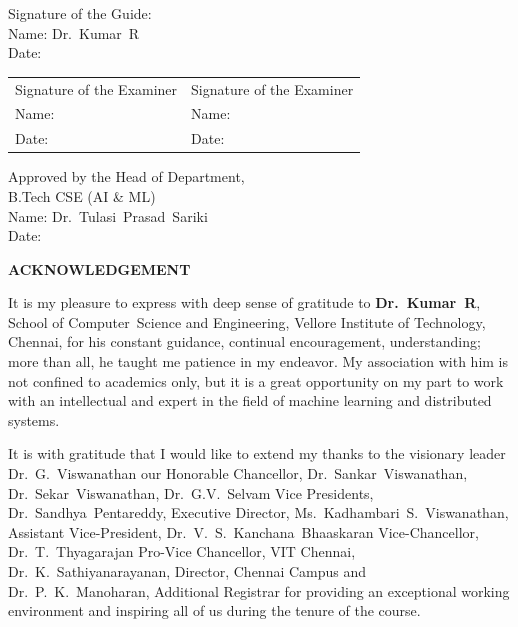 \documentclass[12pt,a4paper]{report}
\begin{document}
\noindent Signature of the Guide:\\
Name: \mbox{Dr.~Kumar~R}\\
Date: 

\vspace{2cm}

\begin{tabular}{p{7cm}p{7cm}}
Signature of the Examiner & Signature of the Examiner \\
Name:  & Name:  \\
Date: & Date: \\
\end{tabular}

\vspace{2cm}

\begin{flushright}
Approved by the Head of Department,\\
B.Tech CSE (AI \& ML)\\[0.3cm]
Name: \mbox{Dr.~Tulasi~Prasad~Sariki}\\
Date: \ \ \ \ \ \ \ \ \ \ \ \ \ \ \ \ \ \ \ \ \ \ \ \ \ \ \ \ \ \ \ \ \ \ \ \ \ \ \ \ \ \
\end{flushright}

\newpage
\begin{center}
{\fontsize{14}{17}\selectfont\bfseries ACKNOWLEDGEMENT}
\end{center}
\vspace{0.5cm}

\noindent It is my pleasure to express with deep sense of gratitude to \textbf{\mbox{Dr.~Kumar~R}}, School of \mbox{Computer Science} and Engineering, Vellore Institute of Technology, Chennai, for his constant guidance, continual encouragement, understanding; more than all, he taught me patience in my endeavor. My association with him is not confined to academics only, but it is a great opportunity on my part to work with an intellectual and expert in the field of machine learning and distributed systems.

\vspace{0.3cm}

\noindent It is with gratitude that I would like to extend my thanks to the visionary leader Dr.~G.~Viswanathan our Honorable Chancellor, Dr.~Sankar~Viswanathan, Dr.~Sekar~Viswanathan, Dr.~G.V.~Selvam Vice Presidents, Dr.~Sandhya~Pentareddy, Executive Director, Ms.~Kadhambari~S.~Viswanathan, Assistant Vice-President, Dr.~V.~S.~Kanchana~Bhaaskaran Vice-Chancellor, Dr.~T.~Thyagarajan Pro-Vice Chancellor, VIT Chennai, Dr.~K.~Sathiyanarayanan, Director, Chennai Campus and Dr.~P.~K.~Manoharan, Additional Registrar for providing an exceptional working environment and inspiring all of us during the tenure of the course.
\end{document}
